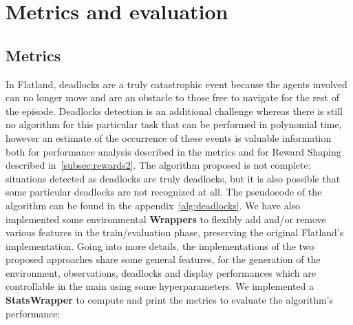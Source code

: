 \documentclass[11pt, a4paper, hidelinks]{report}
\begin{document}
\section{Metrics and evaluation}\label{sec:metrics-and-evaluation}

\subsection{Metrics}\label{subsec:metrics}

In Flatland, deadlocks are a truly catastrophic event because the agents involved can no longer move and are an obstacle to those free to navigate for the rest of the episode.
Deadlocks detection is an additional challenge whereas there is still no algorithm for this particular task that can be performed in polynomial time, however an estimate of the occurrence of these events is valuable information both for performance analysis described in the metrics and for Reward Shaping described in~\ref{subsec:rewards2}.
The algorithm proposed is not complete: situations detected as deadlocks are truly deadlocks, but it is also possible that some particular deadlocks are not recognized at all.
The pseudocode of the algorithm can be found in the appendix~\ref{alg:deadlocks}.
We have also implemented some environmental \textbf{Wrappers} to flexibly add and/or remove various features in the train/evaluation phase, preserving the original Flatland's implementation.
Going into more details, the implementations of the two proposed approaches share some general features, for the generation of the environment, observations, deadlocks and display performances which are controllable in the main using some hyperparameters.
We implemented a \textbf{StatsWrapper} to compute and print the metrics to evaluate the algorithm's performance:
\end{document}
